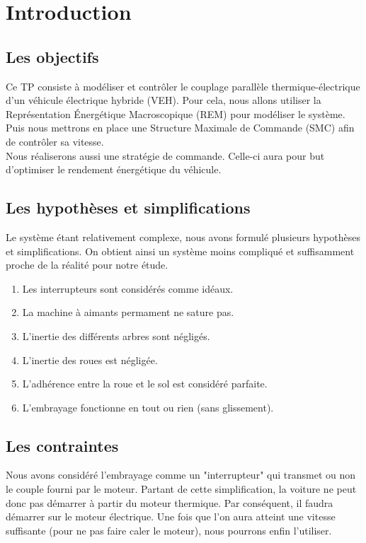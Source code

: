 \section{Introduction}

\subsection{Les objectifs}

	Ce TP consiste à modéliser et contrôler le couplage parallèle thermique-électrique d'un véhicule électrique hybride (VEH). Pour cela, nous allons utiliser la Représentation Énergétique Macroscopique (REM) pour modéliser le système. Puis nous mettrons en place une Structure Maximale de Commande (SMC) afin de contrôler sa vitesse. \\
	Nous réaliserons aussi une stratégie de commande. Celle-ci aura pour but d'optimiser le rendement énergétique du véhicule.

\subsection{Les hypothèses et simplifications}

	Le système étant relativement complexe, nous avons formulé plusieurs hypothèses et simplifications. On obtient ainsi un système moins compliqué et suffisamment proche de la réalité pour notre étude. 

\begin{enumerate} 
\item Les interrupteurs sont considérés comme idéaux.
\item La machine à aimants permament ne sature pas.
\item L'inertie des différents arbres sont négligés.
\item L'inertie des roues est négligée.
\item L'adhérence entre la roue et le sol est considéré parfaite. 
\item L'embrayage fonctionne en tout ou rien (sans glissement).
\end{enumerate}

\subsection{Les contraintes}
	Nous avons considéré l'embrayage comme un "interrupteur" qui transmet ou non le couple fourni par le moteur. Partant de cette simplification, la voiture ne peut donc pas démarrer à partir du moteur thermique. Par conséquent, il faudra démarrer sur le moteur électrique. Une fois que l'on aura atteint une vitesse suffisante (pour ne pas faire caler le moteur), nous pourrons enfin l'utiliser.

